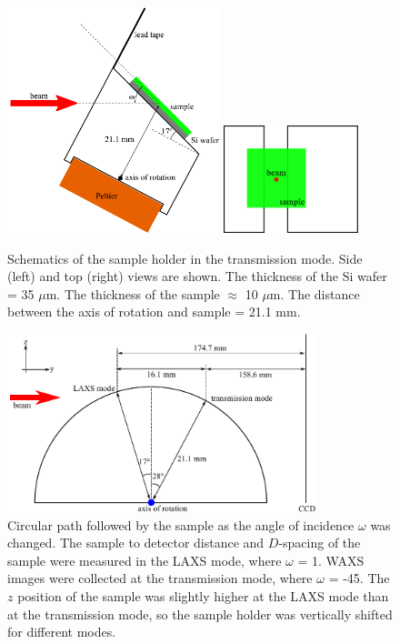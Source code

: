 \begin{figure}[htbp]
  \centering
  \includegraphics[width=0.55\textwidth]{figures/ripple/MMs/transmission/holder_side}
  \includegraphics[width=0.35\textwidth]{figures/ripple/MMs/transmission/holder_top}
  \caption{Schematics of the sample holder in the transmission mode.
  Side (left) and top (right) views are shown. The thickness of the Si wafer
  = 35 $\mu$m. The thickness of the sample $\approx$ 10 $\mu$m. The
  distance between the axis of rotation and sample = 21.1 mm.}
  \label{fig:holder_schematic}
\end{figure}

\begin{figure}[htbp]
  \centering
  \includegraphics[width=0.8\textwidth]{figures/ripple/MMs/transmission/sgeometry}
  \caption{Circular path followed by the sample 
  as the angle of incidence $\omega$ was changed. The sample to detector distance and 
  $D$-spacing of the sample were measured in the LAXS mode, where $\omega$ = 1\textdegree. WAXS images
  were collected at the transmission mode, where $\omega$ = -45\textdegree. 
  The $z$ position of the sample was
  slightly higher at the LAXS mode than at the transmission mode, so the 
  sample holder was vertically shifted for different modes.}
  \label{fig:sgeometry}
\end{figure}

